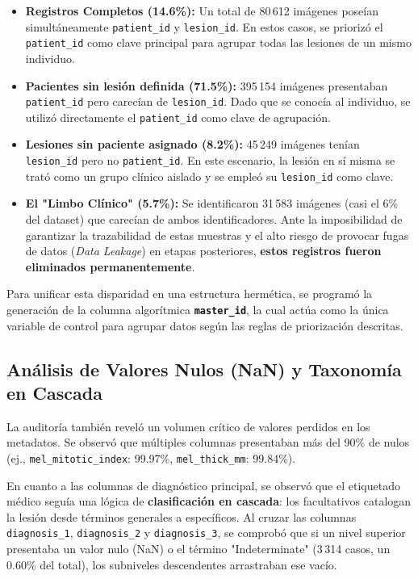 \begin{itemize}
	\item \textbf{Registros Completos (14.6\%):} Un total de 80\,612 imágenes poseían simultáneamente \texttt{patient\_id} y \texttt{lesion\_id}. En estos casos, se priorizó el \texttt{patient\_id} como clave principal para agrupar todas las lesiones de un mismo individuo.
	\item \textbf{Pacientes sin lesión definida (71.5\%):} 395\,154 imágenes presentaban \texttt{patient\_id} pero carecían de \texttt{lesion\_id}. Dado que se conocía al individuo, se utilizó directamente el \texttt{patient\_id} como clave de agrupación.
	\item \textbf{Lesiones sin paciente asignado (8.2\%):} 45\,249 imágenes tenían \texttt{lesion\_id} pero no \texttt{patient\_id}. En este escenario, la lesión en sí misma se trató como un grupo clínico aislado y se empleó su \texttt{lesion\_id} como clave.
	\item \textbf{El "Limbo Clínico" (5.7\%):} Se identificaron 31\,583 imágenes (casi el 6\% del dataset) que carecían de ambos identificadores. Ante la imposibilidad de garantizar la trazabilidad de estas muestras y el alto riesgo de provocar fugas de datos (\textit{Data Leakage}) en etapas posteriores, \textbf{estos registros fueron eliminados permanentemente}.
\end{itemize}

Para unificar esta disparidad en una estructura hermética, se programó la generación de la columna algorítmica \textbf{\texttt{master\_id}}, la cual actúa como la única variable de control para agrupar datos según las reglas de priorización descritas.

\subsection{Análisis de Valores Nulos (NaN) y Taxonomía en Cascada}
La auditoría también reveló un volumen crítico de valores perdidos en los metadatos. Se observó que múltiples columnas presentaban más del 90\% de nulos (ej., \texttt{mel\_mitotic\_index}: 99.97\%, \texttt{mel\_thick\_mm}: 99.84\%). 

En cuanto a las columnas de diagnóstico principal, se observó que el etiquetado médico seguía una lógica de \textbf{clasificación en cascada}: los facultativos catalogan la lesión desde términos generales a específicos. Al cruzar las columnas \texttt{diagnosis\_1}, \texttt{diagnosis\_2} y \texttt{diagnosis\_3}, se comprobó que si un nivel superior presentaba un valor nulo (NaN) o el término "Indeterminate" (3\,314 casos, un 0.60\% del total), los subniveles descendentes arrastraban ese vacío. 

